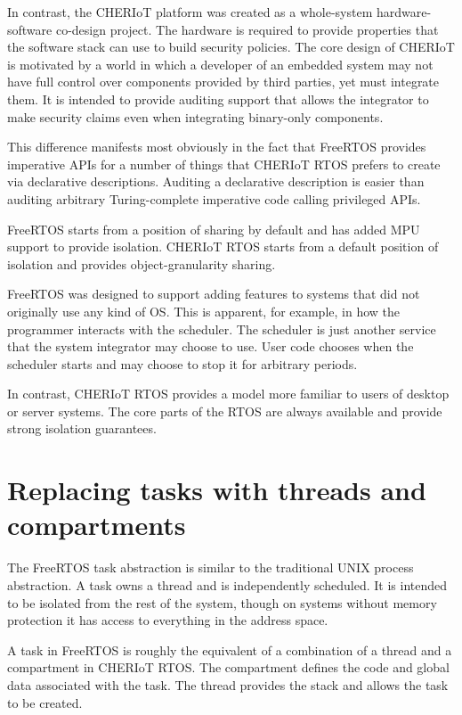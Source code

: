 In contrast, the CHERIoT platform was created as a whole-system hardware-software co-design project.
The hardware is required to provide properties that the software stack can use to build security policies.
The core design of CHERIoT is motivated by a world in which a developer of an embedded system may not have full control over components provided by third parties, yet must integrate them.
It is intended to provide auditing support that allows the integrator to make security claims even when integrating binary-only components.

This difference manifests most obviously in the fact that FreeRTOS provides imperative APIs for a number of things that CHERIoT RTOS prefers to create via declarative descriptions.
Auditing a declarative description is easier than auditing arbitrary Turing-complete imperative code calling privileged APIs.

FreeRTOS starts from a position of sharing by default and has added MPU support to provide isolation.
CHERIoT RTOS starts from a default position of isolation and provides object-granularity sharing.

FreeRTOS was designed to support adding features to systems that did not originally use any kind of OS.
This is apparent, for example, in how the programmer interacts with the scheduler.
The scheduler is just another service that the system integrator may choose to use.
User code chooses when the scheduler starts and may choose to stop it for arbitrary periods.

In contrast, CHERIoT RTOS provides a model more familiar to users of desktop or server systems.
The core parts of the RTOS are always available and provide strong isolation guarantees.

\section{Replacing tasks with threads and compartments}

The FreeRTOS task abstraction is similar to the traditional UNIX process abstraction.
A task owns a thread and is independently scheduled.
It is intended to be isolated from the rest of the system, though on systems without memory protection it has access to everything in the address space.

A task in FreeRTOS is roughly the equivalent of a combination of a thread and a compartment in CHERIoT RTOS.
The compartment defines the code and global data associated with the task.
The thread provides the stack and allows the task to be created.

